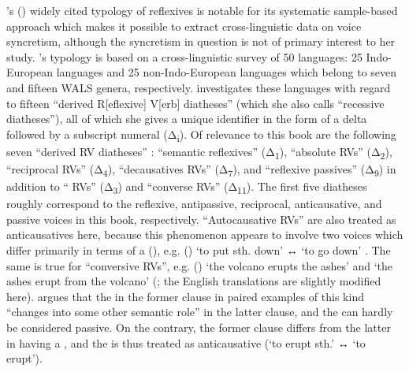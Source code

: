 \citeauthor{geniusiene:1987}’s (\citeyear{geniusiene:1987}) widely cited typology of reflexives is notable for its systematic sample-based approach which makes it possible to extract cross-linguistic data on voice syncretism, although the syncretism in question is not of primary interest to her study. \citeauthor{geniusiene:1987}’s typology is based on a cross-linguistic survey of 50 languages: 25 Indo-European languages and 25 non-Indo-European languages which belong to seven and fifteen WALS genera, respectively. \citet[57, 220ff.]{geniusiene:1987} investigates these languages with regard to fifteen “derived R[eflexive] V[erb] diatheses” (which she also calls “recessive diatheses”), all of which she gives a unique identifier in the form of a delta followed by a subscript numeral (Δ\textsubscript{i}). Of relevance to this book are the following seven “derived RV diatheses” \citep[230]{geniusiene:1987}: “semantic reflexives” (Δ\textsubscript{1}), “absolute RVs” (Δ\textsubscript{2}), “reciprocal RVs” (Δ\textsubscript{4}), “decausatives RVs” (Δ\textsubscript{7}), and “reflexive passives” (Δ\textsubscript{9}) in addition to “ RVs” (Δ\textsubscript{3}) and “converse RVs” (Δ\textsubscript{11}). The first five diatheses roughly correspond to the reflexive, antipassive, reciprocal, anticausative, and passive voices in this book, respectively. “Autocausative RVs” are also treated as anticausatives here, because this phenomenon appears to involve two voices which differ primarily in terms of a  (), e.g.  ()  ‘to put sth. down’ ↔  ‘to go down’ \citep[316]{geniusiene:1987}. The same is true for “conversive RVs”, e.g.  ()  ‘the volcano erupts the ashes’ and  ‘the ashes erupt from the volcano’ (\citealt[273]{geniusiene:1987}; the English translations are slightly modified here). \citet[228]{geniusiene:1987} argues that the  in the former clause in paired examples of this kind “changes into some other semantic role” in the latter clause, and the  can hardly be considered passive. On the contrary, the former clause differs from the latter in having a , and the  is thus treated as anticausative (‘to erupt sth.’ ↔ ‘to erupt’).


